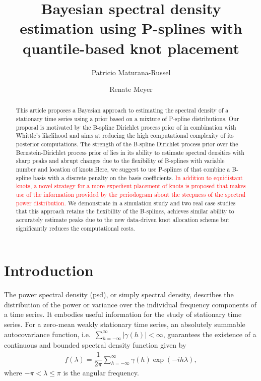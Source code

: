 \documentclass[twocolumn,final]{svjour3}
\title{Bayesian spectral density estimation using P-splines with quantile-based knot placement}
\author{Patricio Maturana-Russel \and Renate Meyer}
\institute{Patricio Maturana-Russel \at Department of Mathematical Sciences, Auckland
	University of Technology, Auckland, New Zealand \\ \email{p.maturana.russel@aut.ac.nz} 
\and Renate Meyer  \at Department of Statistics, University of Auckland, Auckland, New Zealand 
}
\begin{document}
\sloppy  

\maketitle


\begin{abstract}

This article  proposes a Bayesian approach to estimating the spectral density of a stationary time series using a prior based on a mixture of P-spline distributions.  Our proposal is motivated by the B-spline Dirichlet process prior of \cite{Edwards2019} in combination  with Whittle's likelihood and aims at  reducing the high computational complexity of its posterior computations. The strength of the B-spline Dirichlet process prior over the Bernstein-Dirichlet process prior of \cite{Choudhuri:2004}  lies in its ability to estimate spectral densities with sharp peaks and abrupt changes due to the flexibility of B-splines with variable number and location of knots.Here, we suggest to use P-splines of \cite{Eilers:1996} that combine a B-spline basis with a discrete penalty on the basis coefficients.  \textcolor{red}{In addition to equidistant knots, a novel strategy for a more expedient placement of  knots is proposed that makes use of the information provided by the periodogram about the steepness of the spectral power distribution.}
We demonstrate in a simulation study and two real  case studies that this approach retains the flexibility of the B-splines, achieves similar ability to accurately estimate peaks due to the new data-driven knot allocation scheme but significantly reduces the computational costs.

\end{abstract}


\section{Introduction}
The power spectral density (psd), or simply spectral density, describes the distribution of the power or variance over the individual frequency components of a time series.  It embodies useful information for the study of stationary time series.  For a zero-mean weakly stationary time series, an absolutely summable autocovariance function, i.e.\ $\sum_{h=-\infty}^{\infty} |\gamma(h)| <\infty$, guarantees the existence of a continuous and bounded spectral density function given by
\begin{align*}
f(\lambda) = \dfrac{1}{2\pi} \sum_{h = -\infty}^{\infty}\gamma(h)\exp\left(-i h \lambda \right), 
\end{align*}
where $-\pi < \lambda \leq \pi$ is the angular frequency.
\end{document}

